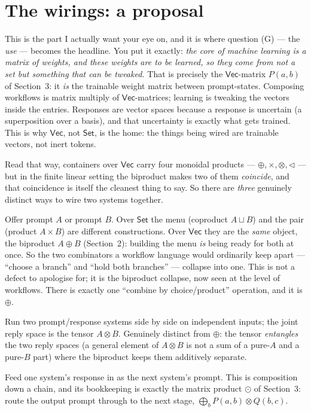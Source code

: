 \documentclass[11pt]{article}
\providecommand{\Vec}{}\renewcommand{\Vec}{\mathsf{Vec}}
\newcommand{\Set}{\mathsf{Set}}
\begin{document}
\section{The wirings: a proposal}

This is the part I actually want your eye on, and it is where question (G) --- the
\emph{use} --- becomes the headline. You put it exactly: \emph{the core of machine
learning is a matrix of weights, and these weights are to be learned, so they come from
not a set but something that can be tweaked.} That is precisely the $\Vec$-matrix
$P(a,b)$ of Section~3: it \emph{is} the trainable weight matrix between prompt-states.
Composing workflows is matrix multiply of $\Vec$-matrices; learning is tweaking the
vectors inside the entries. Responses are vector spaces because a response is uncertain
(a superposition over a basis), and that uncertainty is exactly what gets trained. This
is why $\Vec$, not $\Set$, is the home: the things being wired are trainable vectors,
not inert tokens.

Read that way, containers over $\Vec$ carry four monoidal products ---
$\oplus,\times,\otimes,\lhd$ --- but in the finite linear setting the biproduct makes
two of them \emph{coincide}, and that coincidence is itself the cleanest thing to say.
So there are \emph{three} genuinely distinct ways to wire two systems together.

\begin{description}[leftmargin=1.3em,style=nextline]
\item[$\oplus = \times$ --- menu / both (one wiring, by the biproduct collapse).]
  Offer prompt $A$ or prompt $B$. Over $\Set$ the menu (coproduct $A\sqcup B$) and the
  pair (product $A\times B$) are different constructions. Over $\Vec$ they are the
  \emph{same} object, the biproduct $A\oplus B$ (Section~2): building the menu \emph{is}
  being ready for both at once. So the two combinators a workflow language would
  ordinarily keep apart --- ``choose a branch'' and ``hold both branches'' --- collapse
  into one. This is not a defect to apologise for; it is the biproduct collapse, now
  seen at the level of workflows. There is exactly one ``combine by choice/product''
  operation, and it is $\oplus$.
\item[$\otimes$ --- parallel / entangling.] Run two prompt/response systems side by
  side on independent inputs; the joint reply space is the tensor $A\otimes B$.
  Genuinely distinct from $\oplus$: the tensor \emph{entangles} the two reply spaces
  (a general element of $A\otimes B$ is not a sum of a pure-$A$ and a pure-$B$ part)
  where the biproduct keeps them additively separate.
\item[$\lhd$ --- pipeline.] Feed one system's response in as the next system's prompt.
  This is composition down a chain, and its bookkeeping is exactly the matrix product
  $\odot$ of Section~3: route the output prompt through to the next stage,
  $\bigoplus_b P(a,b)\otimes Q(b,c)$.
\end{description}
\end{document}
